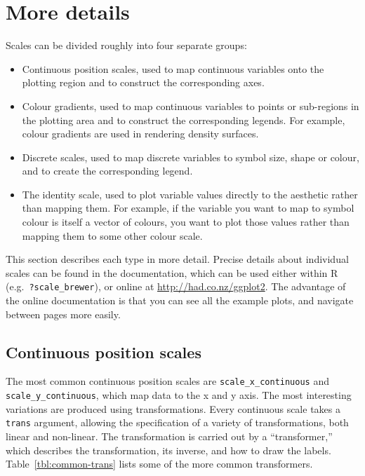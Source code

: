 
\section{More details}
\label{sec:more-details}


Scales can be divided roughly into four separate groups:

\begin{itemize}
  \item Continuous position scales, used to map continuous variables onto the plotting region and to construct the corresponding axes.

  \item Colour gradients, used to map continuous variables to points or sub-regions in the plotting area and to construct the corresponding legends.  For example, colour gradients are used in rendering density surfaces.

  \item Discrete scales, used to map discrete variables to symbol size, shape or colour, and to create the corresponding legend.

  \item The identity scale, used to plot variable values directly to the aesthetic rather than mapping them.  For example, if the variable you want to map to symbol colour is itself a vector of colours, you want to plot those values rather than mapping them to some other colour scale.

\end{itemize}

\noindent  This section describes each type in more detail.  Precise details about individual scales can be found in the documentation, which can be used either within R (e.g.\ {\tt ?scale\_brewer}), or online at  \url{http://had.co.nz/ggplot2}.  The advantage of the online documentation is that you can see all the example plots, and navigate between pages more easily.

\subsection{Continuous position scales}
\label{sub:scale_position}

The most common continuous position scales are {\tt scale\_x\_continuous} and {\tt scale\_y\_continuous}, which map data to the x and y axis.  The most interesting variations are produced using transformations.  Every continuous scale takes a {\tt trans} argument, allowing the specification of a variety of transformations, both linear and non-linear.  The transformation is carried out by a ``transformer,'' which describes the transformation, its inverse, and how to draw the labels. Table~\ref{tbl:common-trans} lists some of the more common transformers.

